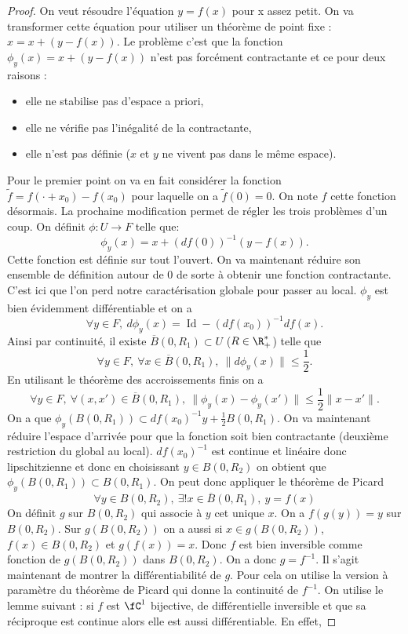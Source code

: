 \documentclass[10pt,a4paper]{article}
\begin{document}
\begin{proof}
On veut résoudre l'équation $y = f(x)$ pour x assez petit. On va transformer cette équation pour utiliser un théorème de point fixe : $x = x + (y-f(x))$. Le problème c'est que la fonction $\phi_y(x) = x + (y-f(x))$ n'est pas forcément contractante et ce pour deux raisons :
\begin{itemize}
\item elle ne stabilise pas d'espace a priori,
\item elle ne vérifie pas l'inégalité de la contractante,
  \item elle n'est pas définie ($x$ et $y$ ne vivent pas dans le même espace).
\end{itemize}
Pour le premier point on va en fait considérer la fonction $\tilde{f} = f(\cdot + x_0) - f(x_0)$ pour laquelle on a $\tilde{f}(0) = 0$. On note $f$ cette fonction désormais. La prochaine modification permet de régler les trois problèmes d'un coup. On définit $\phi: U \rightarrow F$ telle que:
\[ \phi_y(x) = x + (df(0))^{-1}(y-f(x)).\]
Cette fonction est définie sur tout l'ouvert. On va maintenant réduire son ensemble de définition autour de $0$ de sorte à obtenir une fonction contractante. C'est ici que l'on perd notre caractérisation globale pour passer au local. $\phi_y$ est bien évidemment différentiable et on a
\[ \forall y \in F, \ d\phi_y(x) = \operatorname{Id} - (df(x_0))^{-1}df(x).\]
Ainsi par continuité, il existe $\overline{B}(0,R_1) \subset U$ ($R \in \R_+^*$) telle que
\[ \forall y \in F, \ \forall x \in \overline{B}(0,R_1), \ \| d\phi_y(x) \| \le \frac{1}{2} .\]
En utilisant le théorème des accroissements finis on a
\[ \forall y \in F, \ \forall (x,x') \in \overline{B}(0,R_1), \ \| \phi_y(x) - \phi_y(x') \| \le \frac{1}{2} \| x - x' \|.\]
On a que $\phi_y(B(0,R_1)) \subset df(x_0)^{-1}y + \frac{1}{2}B(0,R_1)$. On va maintenant réduire l'espace d'arrivée pour que la fonction soit bien contractante (deuxième restriction du global au local). $df(x_0)^{-1}$ est continue et linéaire donc lipschitzienne et donc en choisissant $y \in B(0,R_2)$ on obtient que $\phi_y(B(0,R_1)) \subset B(0,R_1)$. On peut donc appliquer le théorème de Picard
\[ \forall y \in B(0,R_2), \ \exists ! x \in \overline{B}(0,R_1), \ y = f(x)\]
On définit $g$ sur $B(0,R_2)$ qui associe à $y$ cet unique $x$. On a $f(g(y)) = y$ sur $B(0,R_2)$. Sur $g(B(0,R_2))$ on a aussi si $x \in g(B(0,R_2))$, $f(x) \in B(0,R_2)$ et $g(f(x)) =x$. Donc $f$ est bien inversible comme fonction de $g(B(0,R_2))$ dans $B(0,R_2)$. On a donc $g = f^{-1}$. Il s'agit maintenant de montrer la différentiabilité de $g$. Pour cela on utilise la version à paramètre du théorème de Picard qui donne la continuité de $f^{-1}$. On utilise le lemme suivant : si $f$ est $\fC^1$ bijective, de différentielle inversible et que sa réciproque est continue alors elle est aussi différentiable. En effet,

\end{proof}
\end{document}
